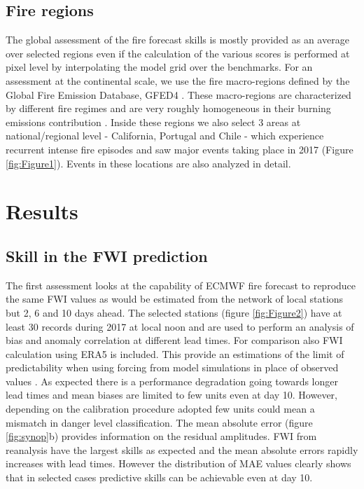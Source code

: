 \documentclass[, manuscript]{copernicus}
\begin{document}
\subsection{Fire regions}

The global assessment of the fire forecast skills is mostly provided as
an average over selected regions even if the calculation of the various
scores is performed at pixel level by interpolating the model grid over
the benchmarks. For an assessment at the continental scale, we use the
fire macro-regions defined by the Global Fire Emission Database, GFED4
\citep{giglio:13}. These macro-regions are characterized by different
fire regimes and are very roughly homogeneous in their burning emissions
contribution \citep{giglio:13}. Inside these regions we also select 3
areas at national/regional level - California, Portugal and Chile -
which experience recurrent intense fire episodes and saw major events
taking place in 2017 (Figure \ref{fig:Figure1}). Events in these
locations are also analyzed in detail.

\section{Results}

\subsection{Skill in the FWI prediction}

The first assessment looks at the capability of ECMWF fire forecast to
reproduce the same FWI values as would be estimated from the network of
local stations but 2, 6 and 10 days ahead. The selected stations (figure
\ref{fig:Figure2}) have at least 30 records during 2017 at local noon
and are used to perform an analysis of bias and anomaly correlation at
different lead times. For comparison also FWI calculation using ERA5 is
included. This provide an estimations of the limit of predictability
when using forcing from model simulations in place of observed values
\citep{digiuseppe:16}. As expected there is a performance degradation
going towards longer lead times and mean biases are limited to few units
even at day 10. However, depending on the calibration procedure adopted
few units could mean a mismatch in danger level classification. The mean
absolute error (figure \ref{fig:synop}b) provides information on the
residual amplitudes. FWI from reanalysis have the largest skills as
expected and the mean absolute errors rapidly increases with lead times.
However the distribution of MAE values clearly shows that in selected
cases predictive skills can be achievable even at day 10.
\end{document}
